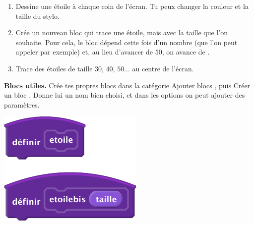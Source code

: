 \documentclass[class=report,crop=false, 12pt]{standalone}
\begin{document}
\begin{activite}
\begin{enumerate}
  \item Dessine une étoile à chaque coin de l'écran. Tu peux changer la couleur et la taille du stylo.
  
  \item Crée un nouveau bloc  qui trace une étoile, mais avec la taille que l'on souhaite. Pour cela, le bloc dépend cette fois d'un nombre (que l'on peut appeler  par exemple) et, au lieu d'avancer de $50$, on avance de .
  
  \item Trace des étoiles de taille $30$, $40$, $50$... au centre de l'écran.
\end{enumerate}

\bigskip

\textbf{Blocs utiles.}
Crée tes propres blocs dans la catégorie \og Ajouter blocs \fg{}, puis \og Créer un bloc \fg{}. Donne lui un nom bien choisi, et dans les options on peut ajouter des paramètres.  

\begin{center}
  \includegraphics[scale=\scalebloc]{bloc-11-ex1} 
\end{center}

\end{activite}
\end{document}
